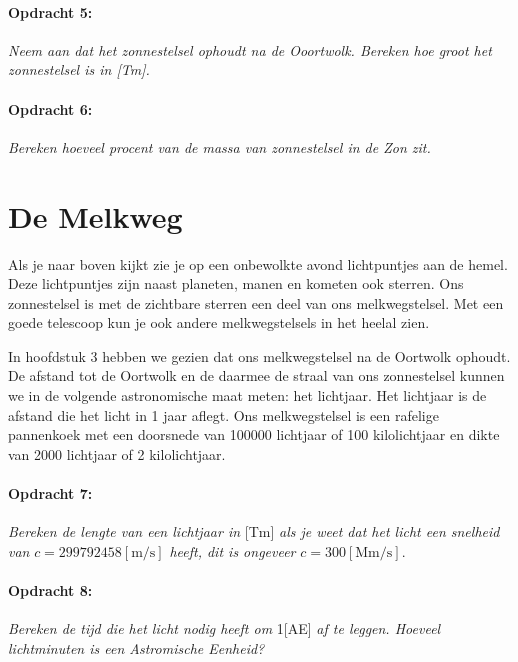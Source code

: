 \paragraph*{Opdracht 5:}

\emph{Neem aan dat het zonnestelsel ophoudt na de Ooortwolk. Bereken
hoe groot het zonnestelsel is in {[}Tm{]}.}


\paragraph*{Opdracht 6:}

\emph{Bereken hoeveel procent van de massa van zonnestelsel in de
Zon zit.}


\section{De Melkweg}

Als je naar boven kijkt zie je op een onbewolkte avond lichtpuntjes
aan de hemel. Deze lichtpuntjes zijn naast pla\-neten, manen en kometen
ook sterren. Ons zonnestelsel is met de zichtbare sterren een deel
van ons melkwegstelsel. Met een goede telescoop kun je ook andere
melkwegstelsels in het heelal zien.

In hoofdstuk 3 hebben we gezien dat ons melkwegstelsel na de Oortwolk
ophoudt. De afstand tot de Oortwolk en de daarmee de straal van ons
zonnestelsel kunnen we in de volgende astronomische maat meten: het
lichtjaar. Het lichtjaar is de afstand die het licht in 1 jaar aflegt.
Ons melkwegstelsel is een rafelige pannenkoek met een doorsnede van
100000 lichtjaar of 100 kilolichtjaar en dikte van 2000 lichtjaar
of 2 kilolichtjaar.


\paragraph*{Opdracht 7:}

\emph{Bereken de lengte van een lichtjaar in} {[}Tm{]} \emph{als je
weet dat het licht een snelheid van} $c=299792458[\mathrm{m/s}]$
\emph{heeft, dit is ongeveer} $c=300[\mathrm{Mm/s}]$.


\paragraph*{Opdracht 8:}

\emph{Bereken de tijd die het licht nodig heeft om} 1{[}AE{]} \emph{af
te leggen. Hoeveel lichtminuten is een Astromische Eenheid?}

